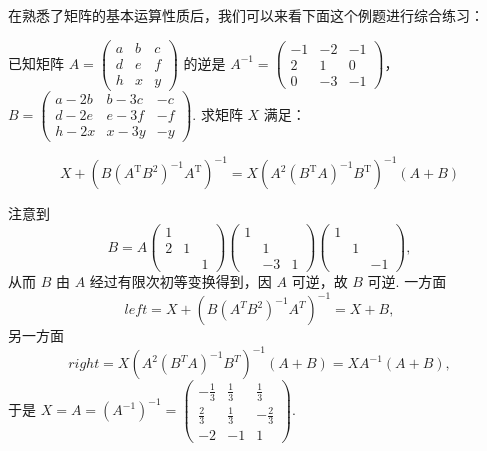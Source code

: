 在熟悉了矩阵的基本运算性质后，我们可以来看下面这个例题进行综合练习：
\begin{example}
    已知矩阵 $A=\begin{pmatrix}a & b & c \\ d & e & f \\ h & x & y\end{pmatrix}$ 的逆是 $A^{-1}=\begin{pmatrix}-1 & -2 & -1 \\ 2 & 1 & 0 \\ 0 & -3 & -1\end{pmatrix}$，\\
    $B=\begin{pmatrix}a-2b & b-3c & -c \\ d-2e & e-3f & -f \\ h-2x & x-3y & -y\end{pmatrix}$. 求矩阵 $X$ 满足：

    \[X+\left(B(A^\mathrm{T}B^2)^{-1}A^\mathrm{T}\right)^{-1}=X\left(A^2(B^\mathrm{T}A)^{-1}B^\mathrm{T}\right)^{-1}(A+B)\]
\end{example}

\begin{solution}
    注意到
    \[B=A\begin{pmatrix}
            1 &  & \\ 2 & 1 & \\ & & 1
        \end{pmatrix} \begin{pmatrix}
            1 &  & \\ & 1 & \\ & -3 & 1
        \end{pmatrix} \begin{pmatrix}
            1 &  & \\ & 1 & \\ & & -1
        \end{pmatrix},\]
    从而 $B$ 由 $A$ 经过有限次初等变换得到，因 $A$ 可逆，故 $B$ 可逆. 一方面
    \[left=X+\left(B\left(A^{T} B^{2}\right)^{-1} A^{T}\right)^{-1}=X+B,\]
    另一方面
    \[right=X\left(A^{2}\left(B^{T} A\right)^{-1} B^{T}\right)^{-1}(A+B)=X A^{-1}(A+B),\]
    于是 $X=A=(A^{-1})^{-1}=\begin{pmatrix}
            -\frac{1}{3} & \frac{1}{3} & \frac{1}{3}  \\
            \frac{2}{3}  & \frac{1}{3} & -\frac{2}{3} \\
            -2           & -1          & 1
        \end{pmatrix}$.
\end{solution}

